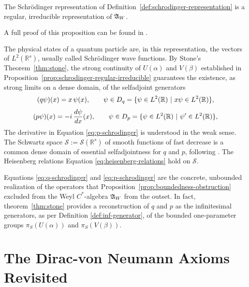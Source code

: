 	\begin{proposition}
		\label{prop:schrodinger-regular-irreducible}
		The Schr\"odinger representation of Definition~\ref{def:schrodinger-representation} is a regular, irreducible representation of $\mathfrak{A}_W$.
	\end{proposition}
	
	\noindent A full proof of this proposition can be found in \cite[p.65]{strocchiIntroductionMathematicalStructure2005}.
	
	\begin{remark}
		\label{rem:schrodinger-generators}
		The physical states of a quantum particle are, in this representation, the vectors of $L^2(\mathbb{R}^s)$, usually called Schr\"odinger wave functions. By Stone's Theorem~\ref{thm:stone}, the strong continuity of $U(\alpha)$ and $V(\beta)$ established in Proposition~\ref{prop:schrodinger-regular-irreducible} guarantees the existence, as strong limits on a dense domain, of the selfadjoint generators
		\begin{equation}
			(q\psi)(x) = x\,\psi(x), \qquad \psi \in D_q = \{\psi \in L^2(\mathbb{R}) \ | \ x\psi \in L^2(\mathbb{R})\},
			\label{eq:q-schrodinger}
		\end{equation}
		\begin{equation}
			(p\psi)(x) = -i\,\frac{d\psi}{dx}(x), \qquad \psi \in D_p = \{\psi \in L^2(\mathbb{R}) \ | \ \psi' \in L^2(\mathbb{R})\},
			\label{eq:p-schrodinger}
		\end{equation}
		The derivative in Equation \eqref{eq:p-schrodinger} is understood in the weak sense. The Schwartz space $\mathcal{S} := \mathcal{S}(\mathbb{R}^s)$ of smooth functions of fast decrease is a common dense domain of essential selfadjointness for $q$ and $p$, following \cite[Chapter VIII, Section 2]{reedMethodsModernMathematical2003}. The Heisenberg relations Equation \eqref{eq:heisenberg-relations} hold on $\mathcal{S}$.
		
		Equations \eqref{eq:q-schrodinger} and \eqref{eq:p-schrodinger} are the concrete, unbounded realization of the operators that Proposition~\ref{prop:boundedness-obstruction} excluded from the Weyl $C^*$-algebra $\mathfrak{A}_W$ from the outset. In fact, theorem~\ref{thm:stone} provides a reconstruction of $q$ and $p$ as the infinitesimal generators, as per Definition \ref{def:inf-generator}, of the bounded one-parameter groups $\pi_S(U(\alpha))$ and $\pi_S(V(\beta))$.
	\end{remark}

	
	\section{The Dirac-von Neumann Axioms Revisited}
	\label{sec:concl-dvn-axioms}
	
